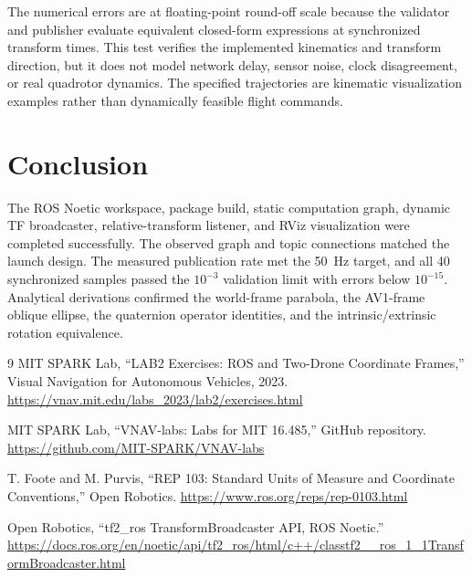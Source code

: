 \documentclass[11pt,a4paper]{article}
\begin{document}
The numerical errors are at floating-point round-off scale because the validator and publisher evaluate equivalent closed-form expressions at synchronized transform times. This test verifies the implemented kinematics and transform direction, but it does not model network delay, sensor noise, clock disagreement, or real quadrotor dynamics. The specified trajectories are kinematic visualization examples rather than dynamically feasible flight commands.

\section{Conclusion}

The ROS Noetic workspace, package build, static computation graph, dynamic TF broadcaster, relative-transform listener, and RViz visualization were completed successfully. The observed graph and topic connections matched the launch design. The measured publication rate met the 50~Hz target, and all 40 synchronized samples passed the $10^{-3}$ validation limit with errors below $10^{-15}$. Analytical derivations confirmed the world-frame parabola, the AV1-frame oblique ellipse, the quaternion operator identities, and the intrinsic/extrinsic rotation equivalence.

\begin{thebibliography}{9}
MIT SPARK Lab, ``LAB2 Exercises: ROS and Two-Drone Coordinate Frames,''
Visual Navigation for Autonomous Vehicles, 2023.
\url{https://vnav.mit.edu/labs_2023/lab2/exercises.html}

MIT SPARK Lab, ``VNAV-labs: Labs for MIT 16.485,'' GitHub repository.
\url{https://github.com/MIT-SPARK/VNAV-labs}

T. Foote and M. Purvis, ``REP 103: Standard Units of Measure and Coordinate Conventions,'' Open Robotics.
\url{https://www.ros.org/reps/rep-0103.html}

Open Robotics, ``tf2\_ros TransformBroadcaster API, ROS Noetic.''
\url{https://docs.ros.org/en/noetic/api/tf2_ros/html/c++/classtf2__ros_1_1TransformBroadcaster.html}
\end{thebibliography}
\end{document}
